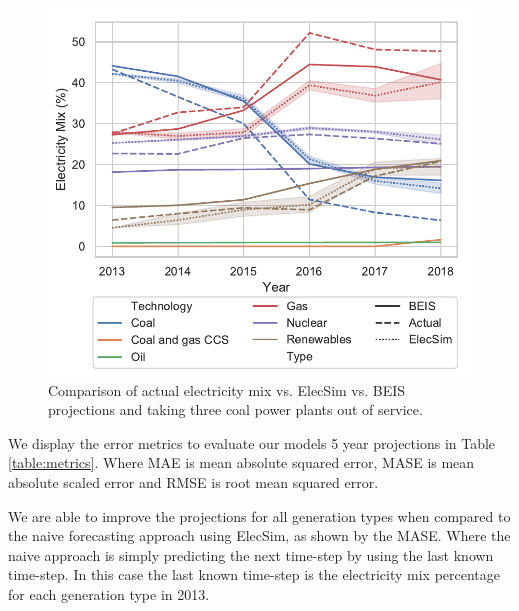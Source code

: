 



\begin{figure}
	\centering
	\includegraphics[width=0.7\columnwidth]{Chapter4/figures/e-Energy-2020/results/throughout_years_beis_elecsim_comparison_coal_dropout_leg_below.pdf}
	\caption{Comparison of actual electricity mix vs. ElecSim vs. BEIS projections and taking three coal power plants out of service.}
	\label{fig:beis_elecsim_historic_comparison}
\end{figure}




We display the error metrics to evaluate our models 5 year projections in Table \ref{table:metrics}. Where MAE is mean absolute squared error, MASE is mean absolute scaled error and RMSE is root mean squared error.

We are able to improve the projections for all generation types when compared to the naive forecasting approach using ElecSim, as shown by the MASE. Where the naive approach is simply predicting the next time-step by using the last known time-step. In this case the last known time-step is the electricity mix percentage for each generation type in 2013. 

